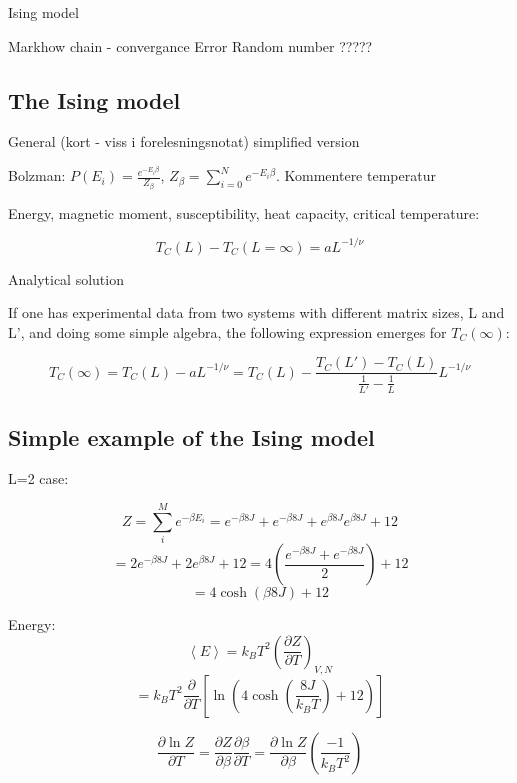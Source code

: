 

Ising model

Markhow chain - convergance
Error
Random number ?????

\subsection{The Ising model}
General (kort - viss i forelesningsnotat)
simplified version


Bolzman: $ P(E_i) = \frac{e^{-E_i\beta}}{Z_{\beta}} $, $ Z_{\beta} = \sum\limits_{i=0}^{N} e^{-E_i\beta}$. 
Kommentere temperatur


Energy, magnetic moment, susceptibility, heat capacity, critical temperature:


\begin{equation}\label{eq:critical_T}
T_C(L) - T_C(L=\infty) = a L^{-1/\nu}
\end{equation}

Analytical solution

If one has experimental data from  two systems with different matrix sizes, L and L',  and doing some simple algebra, the following expression emerges for $T_C(\infty)  $:

\begin{equation}
T_C(\infty) = T_C(L) - aL^{-1/\nu} = T_C(L) - \frac{T_C(L') - T_C(L)}{\frac{1}{L'} - \frac{1}{L}}L^{-1/\nu}
\label{eq:T_infty}
\end{equation}


\subsection{Simple example of the Ising model}

L=2 case:

\[
Z = \sum_i^M e^{-\beta E_i} = e^{-\beta 8 J} + e^{-\beta 8 J} + e^{\beta 8 J}e^{\beta 8 J} + 12
\]
\[
= 2e^{-\beta 8 J}+ 2e^{\beta 8 J} + 12 = 4\left(\frac{e^{-\beta 8 J}+ e^{-\beta 8 J}}{2}\right)+12
\]
\[
= 4 \cosh\left( \beta 8 J \right) + 12
\]


Energy:
\[
\left< E \right> = k_B T^2 \left(\frac{\partial Z}{\partial T}
\right)_{V,N}
\]
\[
= k_B T^2 \frac{\partial}{\partial T} \left[\ln \left(4\cosh \left(\frac{8J}{k_BT}\right) +12\right) \right]\]

\[
\frac{\partial \ln Z}{\partial T} = \frac{\partial Z}{\partial \beta}\frac{\partial \beta}{\partial T} = \frac{\partial \ln Z}{\partial \beta}\left(\frac{-1}{k_B T^2}\right)
\]

